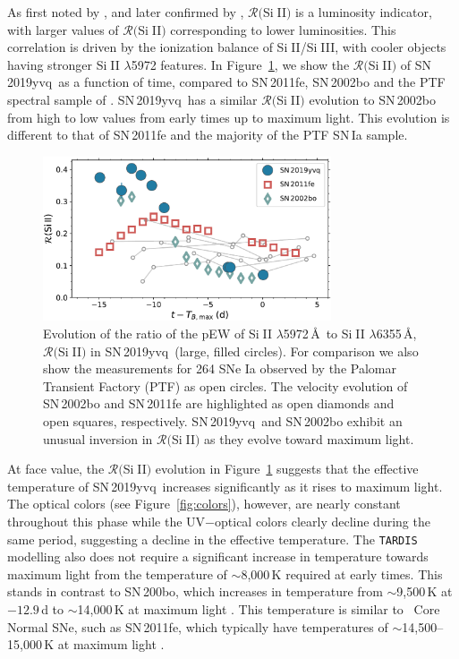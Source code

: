 \documentclass[twocolumn]{aastex63}
\def\ion#1#2{#1$\;${\footnotesize\rm{#2}}\relax}
\newcommand{\sn}{SN\,2019yvq}
\begin{document}
As first noted by \citet{Nugent95}, and later confirmed by
\citet{Hachinger08}, $\mathcal{R}($\ion{Si}{II}$)$ is a luminosity indicator,
with larger values of $\mathcal{R}($\ion{Si}{II}$)$ corresponding to lower
luminosities. This correlation is driven by the ionization balance of
\ion{Si}{II}/\ion{Si}{III}, with cooler objects having stronger \ion{Si}{II}
$\lambda$5972 features. In Figure~\ref{fig:r_evo}, we show the
$\mathcal{R}($\ion{Si}{II}$)$ of \sn\ as a function of time, compared to
SN\,2011fe, SN\,2002bo and the PTF spectral sample of \citet{Maguire14}. \sn\
has a similar $\mathcal{R}($\ion{Si}{II}$)$ evolution to SN\,2002bo from high
to low values from early times up to maximum light. This evolution is
different to that of SN\,2011fe and the majority of the PTF SN\,Ia sample.

\begin{figure}
    \centering
    \includegraphics[width=3.35in]{./figures/R_evolution.pdf}
    \caption{Evolution of the ratio of the pEW of \ion{Si}{II}
    $\lambda$5972\,\AA\ to \ion{Si}{II} $\lambda$6355\,\AA,
    $\mathcal{R}($\ion{Si}{II}$)$ in \sn\ (large, filled circles). For
    comparison we also show the measurements for 264 SNe Ia observed by the
    Palomar Transient Factory (PTF) as open circles. The velocity evolution
    of SN\,2002bo and SN\,2011fe are highlighted as open diamonds and open
    squares, respectively. \sn\ and SN\,2002bo exhibit an unusual inversion
    in $\mathcal{R}($\ion{Si}{II}$)$ as they evolve toward maximum light.}
    \label{fig:r_evo}
\end{figure}

At face value, the $\mathcal{R}($\ion{Si}{II}$)$ evolution in
Figure~\ref{fig:r_evo} suggests that the effective temperature of \sn\
increases significantly as it rises to maximum light. The optical colors (see
Figure~\ref{fig:colors}), however, are nearly constant throughout this phase
while the UV$ - $optical colors clearly decline during the same period,
suggesting a decline in the effective temperature. The \texttt{TARDIS}
modelling also does not require a significant increase in temperature towards
maximum light from the temperature of $\sim$8,000\,K required at early times.
This stands in contrast to SN\,200bo, which increases in temperature from
$\sim$9,500\,K at $-12.9$\,d to $\sim$14,000\,K at maximum light
\citep{Stehle05}. This temperature is similar to \citeauthor{Branch06}~Core
Normal SNe, such as SN\,2011fe, which typically have temperatures of
$\sim$14,500--15,000\,K at maximum light \citep{Mazzali14}.
\end{document}
